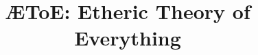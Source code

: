 \documentclass[11pt,oneside]{book}
\begin{document}
\frontmatter
\title{ÆToE: Etheric Theory of Everything}
\author{}
\maketitle
\tableofcontents
\mainmatter
\end{document}

